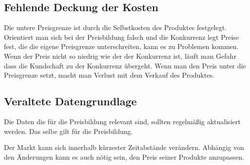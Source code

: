 \subsection{Fehlende Deckung der Kosten}
Die untere Preisgrenze ist durch die Selbstkosten des Produktes festgelegt. Orientiert man sich bei der Preisbildung falsch und die Konkurrenz legt Preise fest, die die eigene Preisgrenze unterschreiten, kann es zu Problemen kommen. Wenn der Preis nicht so niedrig wie der der Konkurrenz ist, läuft man Gefahr dass die Kundschaft zu der Konkurrenz übergeht. Wenn man den Preis unter die Preisgrenze setzt, macht man Verlust mit dem Verkauf des Produktes.
\subsection{Veraltete Datengrundlage}
Die Daten die für die Preisbildung relevant sind, sollten regelmä\ss{}ig aktualisiert werden. Das selbe gilt für die Preisbildung. 

Der Markt kann sich innerhalb kürzester Zeitabstände verändern. Abhängig von den Änderungen kann es auch nötig sein, den Preis seiner Produkte anzupassen. 
